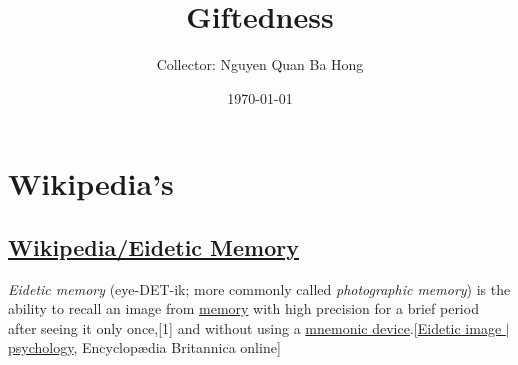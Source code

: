 \documentclass{book}
\title{Giftedness}
\author{Collector: Nguyen Quan Ba Hong}
\date{\today}
\numberwithin{equation}{section}
\begin{document}
\maketitle
\setcounter{secnumdepth}{6}
\setcounter{tocdepth}{6}
\tableofcontents


\part{Wikipedia's}

\chapter{\href{https://en.wikipedia.org/wiki/Eidetic_memory}{Wikipedia/Eidetic Memory}}

\textit{Eidetic memory} (eye-DET-ik; more commonly called \textit{photographic memory}) is the ability to recall an image from \href{https://en.wikipedia.org/wiki/Memory}{memory} with high precision for a brief period after seeing it only once,[1] and without using a \href{https://en.wikipedia.org/wiki/Mnemonic_device}{mnemonic device}.[\href{http://www.britannica.com/EBchecked/topic/180955/eidetic-image}{Eidetic image $|$ psychology}, Encyclop\ae dia Britannica online]
\end{document}
